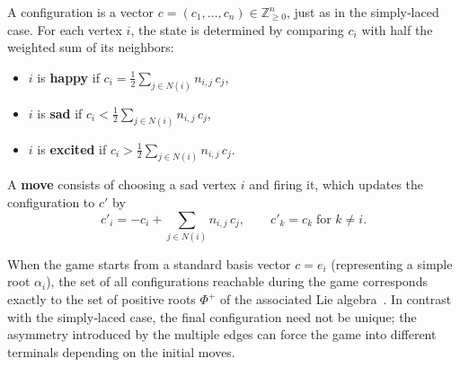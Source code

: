 \documentclass[11pt,a4paper]{amsart}
\newcommand{\Z}{\mathbb{Z}}
\theoremstyle{plain}
\theoremstyle{definition}
\theoremstyle{remark}
\begin{document}
A configuration is a vector $c = (c_1,\dots,c_n)\in \Z_{\ge 0}^n$, just as in the simply‑laced case. For each vertex $i$, the state is determined by comparing $c_i$ with half the weighted sum of its neighbors:
\begin{itemize}
    \item $i$ is \textbf{happy} if $\displaystyle c_i = \frac12 \sum_{j\in N(i)} n_{i,j}\,c_j$,
    \item $i$ is \textbf{sad} if $\displaystyle c_i < \frac12 \sum_{j\in N(i)} n_{i,j}\,c_j$,
    \item $i$ is \textbf{excited} if $\displaystyle c_i > \frac12 \sum_{j\in N(i)} n_{i,j}\,c_j$.
\end{itemize}
A \textbf{move} consists of choosing a sad vertex $i$ and firing it, which updates the configuration to $c'$ by
\[
c'_i = -c_i + \sum_{j\in N(i)} n_{i,j}\,c_j, \qquad c'_k = c_k\;\text{for }k\neq i.
\]

When the game starts from a standard basis vector $c=e_i$ (representing a simple root $\alpha_i$), the set of all configurations reachable during the game corresponds exactly to the set of positive roots $\Phi^+$ of the associated Lie algebra~\cite{chen2017}. In contrast with the simply‑laced case, the final configuration need not be unique; the asymmetry introduced by the multiple edges can force the game into different terminals depending on the initial moves.
\end{document}
